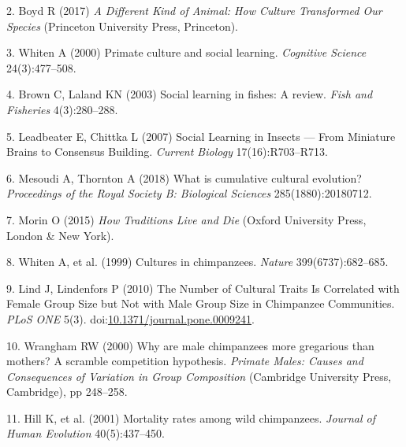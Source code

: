 \documentclass[9pt,twocolumn,twoside,]{pnas-new}
\begin{document}
\hypertarget{ref-boyd_different_2017}{}
2. Boyd R (2017) \emph{A Different Kind of Animal: How Culture
Transformed Our Species} (Princeton University Press, Princeton).

\hypertarget{ref-whiten_primate_2000}{}
3. Whiten A (2000) Primate culture and social learning. \emph{Cognitive
Science} 24(3):477--508.

\hypertarget{ref-brown_social_2003}{}
4. Brown C, Laland KN (2003) Social learning in fishes: A review.
\emph{Fish and Fisheries} 4(3):280--288.

\hypertarget{ref-leadbeater_social_2007}{}
5. Leadbeater E, Chittka L (2007) Social Learning in Insects --- From
Miniature Brains to Consensus Building. \emph{Current Biology}
17(16):R703--R713.

\hypertarget{ref-mesoudi_what_2018}{}
6. Mesoudi A, Thornton A (2018) What is cumulative cultural evolution?
\emph{Proceedings of the Royal Society B: Biological Sciences}
285(1880):20180712.

\hypertarget{ref-morin_how_2015}{}
7. Morin O (2015) \emph{How Traditions Live and Die} (Oxford University
Press, London \& New York).

\hypertarget{ref-whiten_cultures_1999}{}
8. Whiten A, et al. (1999) Cultures in chimpanzees. \emph{Nature}
399(6737):682--685.

\hypertarget{ref-lind_number_2010}{}
9. Lind J, Lindenfors P (2010) The Number of Cultural Traits Is
Correlated with Female Group Size but Not with Male Group Size in
Chimpanzee Communities. \emph{PLoS ONE} 5(3).
doi:\href{https://doi.org/10.1371/journal.pone.0009241}{10.1371/journal.pone.0009241}.

\hypertarget{ref-wrangham_why_2000}{}
10. Wrangham RW (2000) Why are male chimpanzees more gregarious than
mothers? A scramble competition hypothesis. \emph{Primate Males: Causes
and Consequences of Variation in Group Composition} (Cambridge
University Press, Cambridge), pp 248--258.

\hypertarget{ref-hill_mortality_2001}{}
11. Hill K, et al. (2001) Mortality rates among wild chimpanzees.
\emph{Journal of Human Evolution} 40(5):437--450.



% 
\end{document}
